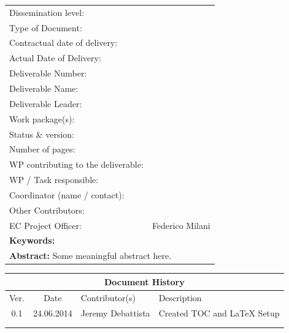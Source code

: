 \documentclass[a4paper]{article}
\begin{document}
\begin{titlepage}
\begin{center}
  \begin{tabular}{@{}|ll|}
    \hline
    Dissemination level:  & \\
    Type of Document:  & \\
    Contractual date of delivery: & \\
    Actual Date of Delivery:  & \\
    Deliverable Number: & \\
    Deliverable Name: & \\
    Deliverable Leader: & \\
    Work package(s): & \\ 
    Status \& version: & \\
    Number of pages: & \\
    WP contributing to the deliverable: & \\  
    WP / Task responsible: & \\ 
    Coordinator (name / contact): & \\  
    Other Contributors: & \\
    EC Project Officer: & Federico Milani \\
    \multicolumn{2}{|p{15cm}|}{\cellcolor{gray!20}
      \textbf{Keywords:} 
    } \\
    \multicolumn{2}{|p{15cm}|}{\cellcolor{gray!50}
      \textbf{Abstract:} \newline
      Some meaningful abstract here.
    } \\
    \hline
  \end{tabular}
\end{center}

\end{titlepage}

\begin{center}
  \begin{tabular}{|c|c|p{6cm}|p{7cm}|}
    \hline
    \multicolumn{4}{|c|}{\cellcolor{CornflowerBlue}Document History} \\
    \hline
    \rowcolor{LightSteelBlue}
    Ver. & Date & Contributor(s) & Description \\
    \hline
    0.1 & 24.06.2014 & Jeremy Debattista & Created TOC and LaTeX Setup \\
    \hline
    & & & \\
    \hline
    & & & \\ 
    \hline
  \end{tabular}
\end{center}
\end{document}
